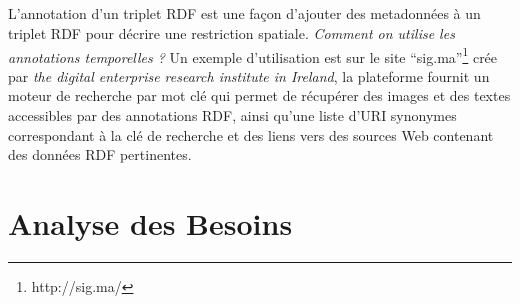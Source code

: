 \documentclass[12pt,a4	]{report}
\begin{document}
\subparagraph{}
L'annotation d'un triplet RDF est une façon d'ajouter des metadonnées à un triplet RDF pour décrire une restriction spatiale.
\newline
\textit{Comment on utilise les annotations temporelles ?} Un exemple d'utilisation est sur le site ``sig.ma''\footnote{http://sig.ma/} crée par \textit{the digital enterprise research institute in Ireland}, la plateforme fournit un moteur de recherche par mot clé qui permet de récupérer des images et des textes accessibles par des annotations RDF, ainsi qu'une liste d'URI synonymes correspondant à la clé de recherche et des liens vers des sources Web contenant des données RDF pertinentes.
\section{Analyse des Besoins}
\end{document}
